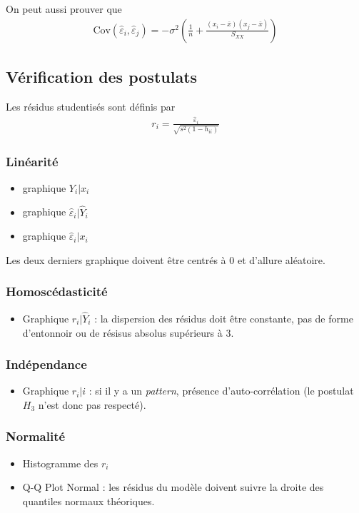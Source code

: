\documentclass[10pt, french]{article}
\begin{document}
\begin{multicols*}{3}
On peut aussi prouver que
\begin{align*}
\mathrm{Cov}(\hat{\varepsilon}_i, \hat{\varepsilon}_j) = - \sigma^2 \left( \frac{1}{n} + \frac{(x_i - \bar{x})(x_j - \bar{x})}{S_{XX}} \right)
\end{align*}

\subsection*{Vérification des postulats}
Les résidus studentisés sont définis par
\begin{align*}
r_i = \frac{\hat{\varepsilon}_i}{\sqrt{s^2(1 - h_{ii})}}
\end{align*}
\subsubsection*{Linéarité}
\begin{itemize}
\item graphique $Y_i | x_i$
\item graphique $\hat{\varepsilon}_i | \hat{Y}_i$
\item graphique $\hat{\varepsilon}_i | x_i$
\end{itemize}
Les deux derniers graphique doivent être centrés à 0 et d'allure aléatoire.

\subsubsection*{Homoscédasticité}
\begin{itemize}
\item Graphique $r_i | \hat{Y}_i$ : la dispersion des résidus doit être constante, pas de forme d'entonnoir ou de résisus absolus supérieurs à 3.
\end{itemize}

\subsubsection*{Indépendance}
\begin{itemize}
\item Graphique $r_i|i$ : si il y a un \textit{pattern}, présence d'auto-corrélation (le postulat $H_3$ n'est donc pas respecté).
\end{itemize}

\subsubsection*{Normalité}
\begin{itemize}
\item Histogramme des $r_i$
\item Q-Q Plot Normal : les résidus du modèle doivent suivre la droite des quantiles normaux théoriques.
\end{itemize}





\end{multicols*}
\end{document}
